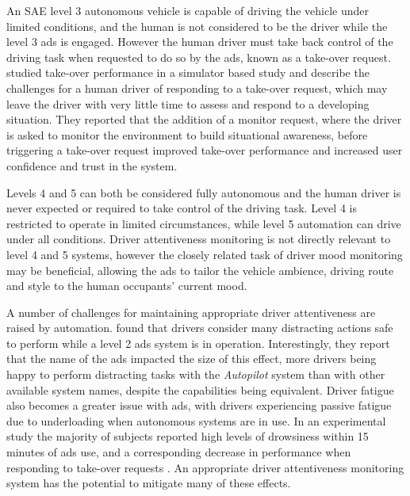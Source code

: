 \documentclass[11pt, parskip=half*,twoside=false]{scrbook}
\begin{document}
An SAE level 3 autonomous vehicle is capable of driving the vehicle under limited conditions, and the human is not considered to be the driver while the level 3 \gls{ads} is engaged. However the human driver must take back control of the driving task when requested to do so by the \gls{ads}, known as a take-over request.  \citet{luMereTakeoverRequests2019} studied take-over performance in a simulator based study and describe the challenges for a human driver of responding to a take-over request, which may leave the driver with very little time to assess and respond to a developing situation. They reported that the addition of a monitor request, where the driver is asked to monitor the environment to build situational awareness, before triggering a take-over request improved take-over performance and increased user confidence and trust in the system.

Levels 4 and 5 can both be considered fully autonomous and the human driver is never expected or required to take control of the driving task. Level 4 is restricted to operate in limited circumstances, while level 5 automation can drive under all conditions. Driver attentiveness monitoring is not directly relevant to level 4 and 5 systems, however the closely related task of driver mood monitoring may be beneficial, allowing the \gls{ads} to tailor the vehicle ambience, driving route and style to the human occupants' current mood.

A number of challenges for maintaining appropriate driver attentiveness are raised by automation. \citet{teohWhatNameDrivers2020} found that drivers consider many distracting actions safe to perform while a level 2 \gls{ads} system is in operation. Interestingly, they report that the name of the \gls{ads} impacted the size of this effect, more drivers being happy to perform distracting tasks with the \emph{Autopilot} system than with other available system names, despite the capabilities being equivalent. Driver fatigue also becomes a greater issue with \gls{ads}, with drivers experiencing passive fatigue due to underloading when autonomous systems are in use. In an experimental study the majority of subjects reported high levels of drowsiness within 15 minutes of \gls{ads} use, and a corresponding decrease in performance when responding to take-over requests \citep{goncalvesDrowsinessConditionalAutomation2016}. An appropriate driver attentiveness monitoring system has the potential to mitigate many of these effects. 
\end{document}
